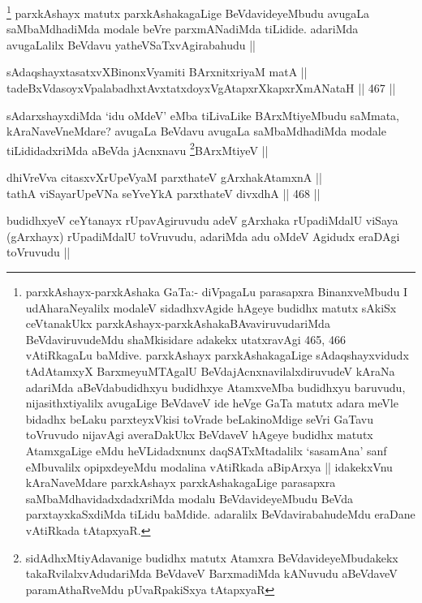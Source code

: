 \begin{artha}
\footnote{parxkAshayx-parxkAshaka GaTa:- diVpagaLu parasapxra BinanxveMbudu I udAharaNeyalilx modaleV sidadhxvAgide hAgeye budidhx matutx sAkiSx ceVtanakUkx parxkAshayx-parxkAshakaBAvaviruvudariMda BeVdaviruvudeMdu shaMkisidare adakekx utatxravAgi 465, 466 vAtiRkagaLu baMdive. parxkAshayx parxkAshakagaLige sAdaqshayxvidudx tAdAtamxyX BarxmeyuMTAgalU BeVdajAcnxnavilalxdiruvudeV kAraNa adariMda aBeVdabudidhxyu budidhxye AtamxveMba budidhxyu baruvudu, nijasithxtiyalilx avugaLige BeVdaveV ide heVge GaTa matutx adara meVle bidadhx beLaku parxteyxVkisi toVrade beLakinoMdige seVri GaTavu toVruvudo nijavAgi averaDakUkx BeVdaveV hAgeye budidhx matutx AtamxgaLige eMdu heVLidadxnunx daqSATxMtadalilx `sasamAna' sanf eMbuvalilx opipxdeyeMdu modalina vAtiRkada aBipArxya || idakekxVnu kAraNaveMdare parxkAshayx parxkAshakagaLige parasapxra saMbaMdhavidadxdadxriMda modalu BeVdavideyeMbudu BeVda parxtayxkaSxdiMda tiLidu baMdide. adaralilx BeVdavirabahudeMdu eraDane vAtiRkada tAtapxyaR.} parxkAshayx matutx parxkAshakagaLige BeVdavideyeMbudu avugaLa saMbaMdhadiMda modale beVre parxmANadiMda tiLidide. adariMda avugaLalilx BeVdavu yatheVSaTxvAgirabahudu ||
\end{artha}

\begin{shl}
sAdaqshayxtasatxvXBinonxV\s yamiti BArxnitxriyaM matA || \\
tadeBxVdasoyxVpalabadhxtAvxtatxdoyxVgAtapxrXkapxrXmANataH ||  467 ||  
\end{shl}

\begin{artha}
sAdarxshayxdiMda `idu oMdeV' eMba tiLivaLike BArxMtiyeMbudu saMmata, kAraNaveVneMdare? avugaLa BeVdavu avugaLa saMbaMdhadiMda modale tiLididadxriMda aBeVda jAcnxnavu \footnote{sidAdhxMtiyAdavanige budidhx matutx Atamxra BeVdavideyeMbudakekx takaRvilalxvAdudariMda BeVdaveV BarxmadiMda kANuvudu aBeVdaveV paramAthaRveMdu pUvaRpakiSxya tAtapxyaR}BArxMtiyeV ||
\end{artha}

\begin{shl}
dhiVreVva citasxvXrUpeVyaM parxthateV gArxhakAtamxnA || \\
tathA viSayarUpeVNa seYveYkA parxthateV divxdhA ||  468 ||  
\end{shl}

\begin{artha}
budidhxyeV ceYtanayx rUpavAgiruvudu adeV gArxhaka rUpadiMdalU viSaya (gArxhayx) rUpadiMdalU toVruvudu, adariMda adu oMdeV Agidudx eraDAgi toVruvudu ||
\end{artha}

